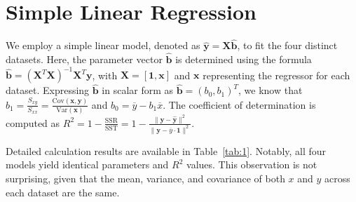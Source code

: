 \documentclass[12pt]{article}
\begin{document}
	\section{Simple Linear Regression}

%


We employ a simple linear model, denoted as $\hat{\mathbf{y}} = \mathbf{X}\hat{\mathbf{b}}$, to fit the four distinct datasets. Here, the parameter vector $\hat{\mathbf{b}}$ is determined using the formula $\hat{\mathbf{b}} = (\mathbf{X}^T\mathbf{X})^{-1}\mathbf{X}^T\mathbf{y}$, with $\mathbf{X} = [\mathbf{1}, \mathbf{x}]$ and $\mathbf{x}$ representing the regressor for each dataset. Expressing $\hat{\mathbf{b}}$ in scalar form as $\hat{\mathbf{b}} = \left( b_0,b_1 \right)^T$, we know that $b_1 = \frac{S_{xy}}{S_{xx}} = \frac{\text{Cov}(\mathbf{x},\mathbf{y})}{\text{Var}(\mathbf{x})}$ and $b_0 = \overline{y} - b_1 \overline{x}$. The coefficient of determination is computed as $R^2 = 1-\frac{\text{SSR}}{\text{SST}} = 1 - \frac{\rVert \mathbf{y} - \hat{\mathbf{y}}\rVert^2}{\rVert \mathbf{y} - \overline{y}\cdot\mathbf{1}\rVert^2}$. 

Detailed calculation results are available in Table~\ref{tab:1}. Notably, all four models yield identical parameters and $R^2$ values. This observation is not surprising, given that the mean, variance, and covariance of both $x$ and $y$ across each dataset are the same.
\end{document}
